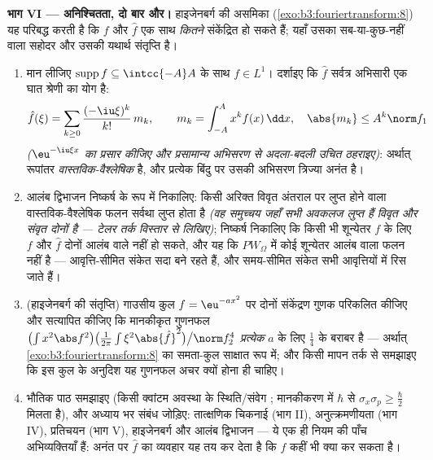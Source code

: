 \begin{problem}[{सप्ताहांत समस्या --- $\partial_tu =
\partial^2_{xx}u$, आरंभ से अंत तक हल}]
\medskip
\noindent\textbf{भाग VI --- अनिश्चितता, दो बार और।}
हाइजेनबर्ग की असमिका (\cref{exo:b3:fouriertransform:8}) यह परिबद्ध करती है कि $f$ और $\hat f$
एक साथ \emph{कितने} संकेंद्रित हो सकते हैं; यहाँ उसका सब-या-कुछ-नहीं
वाला सहोदर और उसकी यथार्थ संतृप्ति है।
\begin{enumerate}[resume]
  \item मान लीजिए $\operatorname{supp}f \subseteq
        \intcc{-A}A$ के साथ $f \in L^1$। दर्शाइए कि $\hat f$ सर्वत्र
        अभिसारी एक घात श्रेणी का योग है:
        \[
        \hat f(\xi) = \sum_{k\geq0}\frac{(-\iu\xi)^k}{k!}
        \,m_k, \qquad m_k = \int_{-A}^{A}x^kf(x)\,\dd x,
        \quad \abs{m_k} \leq A^k\norm f_1
        \]
        \emph{($\eu^{-\iu\xi x}$ का प्रसार कीजिए और प्रसामान्य अभिसरण से
        अदला-बदली उचित ठहराइए)}: अर्थात् रूपांतर
        \emph{वास्तविक-वैश्लेषिक} है, और प्रत्येक बिंदु पर उसकी
        अभिसरण त्रिज्या अनंत है।
  \item आलंब द्विभाजन निष्कर्ष के रूप में निकालिए: किसी अरिक्त
        विवृत अंतराल पर लुप्त होने वाला वास्तविक-वैश्लेषिक फलन
        सर्वथा लुप्त होता है \emph{(वह समुच्चय जहाँ सभी अवकलज
        लुप्त हैं विवृत और संवृत दोनों है --- टेलर तर्क विस्तार से
        लिखिए)}; निष्कर्ष निकालिए कि किसी भी शून्येतर $f$ के लिए
        $f$ और $\hat f$ दोनों  आलंब वाले नहीं हो सकते, और यह कि
        $PW_\Omega$ में कोई शून्येतर  आलंब वाला फलन नहीं है ---
        आवृत्ति-सीमित संकेत सदा बने रहते हैं, और समय-सीमित संकेत
        सभी आवृत्तियों में रिस जाते हैं।
  \item (हाइजेनबर्ग की संतृप्ति) गाउसीय कुल $f
        = \eu^{-ax^2}$ पर दोनों
        संकेंद्रण गुणक परिकलित कीजिए और सत्यापित कीजिए कि
        मानकीकृत गुणनफल $\bigl(\int x^2\abs f^2\bigr)\bigl(\frac1{2\pi}\int
        \xi^2\abs{\hat f}^2\bigr)\big/\norm f_2^4$ \emph{प्रत्येक} $a$ के लिए $\frac14$
        के बराबर है --- अर्थात् \cref{exo:b3:fouriertransform:8} का समता-कुल साक्षात रूप में;
        और किसी मापन तर्क से समझाइए कि इस कुल के अनुदिश यह गुणनफल
        अचर क्यों होना ही चाहिए।
  \item भौतिक पाठ समझाइए (किसी क्वांटम अवस्था के स्थिति/संवेग
        ; मानकीकरण में $\hbar$ से $\sigma_x\sigma_p \geq
        \frac\hbar2$ मिलता है), और अध्याय
        भर संबंध जोड़िए: तात्क्षणिक चिकनाई (भाग II), अनुत्क्रमणीयता
        (भाग IV), प्रतिचयन (भाग V), हाइजेनबर्ग और आलंब द्विभाजन
        --- ये एक ही नियम की पाँच अभिव्यक्तियाँ हैं: अनंत पर
        $\hat f$ का व्यवहार यह तय कर देता है कि $f$ कहीं भी क्या
        कर सकता है।
\end{enumerate}


\end{problem}
